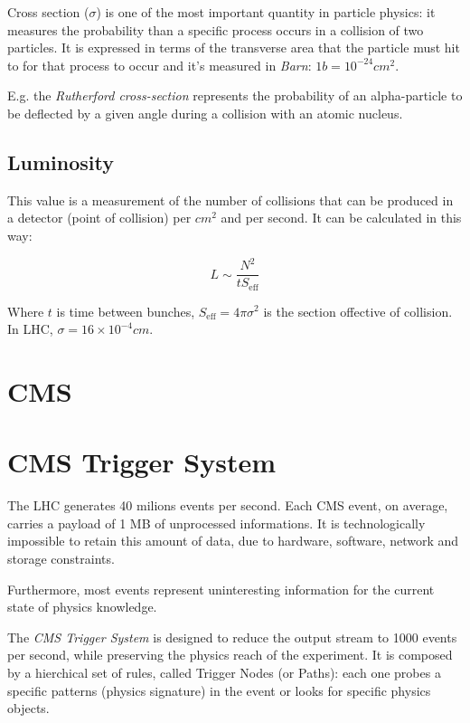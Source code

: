 Cross section ($\sigma$) is one of the most important quantity in particle physics: it measures the probability than a specific process occurs in a collision of two particles. It is expressed in terms of the transverse area that the particle must hit to for that process to occur and it's measured in \textit{Barn}: $1b = 10^{-24} cm^2$.

E.g. the \textit{Rutherford cross-section} represents the probability of an alpha-particle to be deflected by a given angle during a collision with an atomic nucleus.

\subsection{Luminosity}

This value is a measurement of the number of collisions that can be produced in a detector (point of collision) per $cm^2$ and per second. It can be calculated in this way:

\begin{equation}
L\sim \frac{N^2}{t S_{\text{eff}}}
\end{equation}

Where $t$ is time between bunches, $S_{\text{eff}} = 4 \pi \sigma^2$ is the section offective of collision. In LHC, $\sigma = 16\times 10^{-4} cm$.

\section{CMS}

\section{CMS Trigger System}


The LHC generates 40 milions events per second. Each CMS event, on average, carries a payload of 1 MB of unprocessed informations. It is technologically impossible to retain this amount of data, due to hardware, software, network and storage constraints.

Furthermore, most events represent uninteresting information for the current state of physics knowledge.

The \textit{CMS Trigger System} is designed to reduce the output stream to 1000 events per second, while preserving the physics reach of the experiment.
It is composed by a hierchical set of rules, called Trigger Nodes (or Paths): each one probes a specific patterns (physics signature) in the event or looks for specific physics objects.

